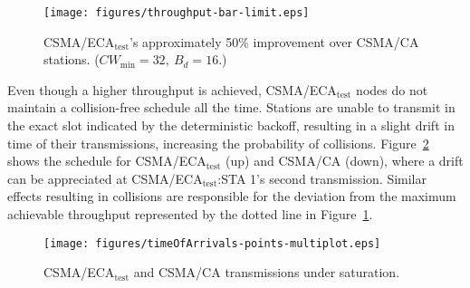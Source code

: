 \documentclass[conference]{IEEEtran}
\begin{document}
	
	\begin{figure}[htbp]
		\centering
		\texttt{[image: figures/throughput-bar-limit.eps]}
		\caption{CSMA/ECA$_{\text{test}}$'s approximately 50\% improvement over CSMA/CA stations. ($CW_{\min}=32,~B_{d}=16$.)}
		\label{fig:throughput}
	\end{figure}

Even though a higher throughput is achieved, CSMA/ECA$_{\text{test}}$ nodes do not maintain a collision-free schedule all the time. Stations are unable to transmit in the exact slot indicated by the deterministic backoff, resulting in a slight drift in time of their transmissions, increasing the probability of collisions. Figure~\ref{fig:ECA-test} shows the schedule for CSMA/ECA$_{\text{test}}$ (up) and CSMA/CA (down), where a drift can be appreciated at CSMA/ECA$_{\text{test}}$:STA 1's second transmission. Similar effects resulting in collisions are responsible for the deviation from the maximum achievable throughput represented by the dotted line in Figure~\ref{fig:throughput}.



	\begin{figure}[htbp]
		\centering
		\texttt{[image: figures/timeOfArrivals-points-multiplot.eps]}
		\caption{CSMA/ECA$_{\text{test}}$ and CSMA/CA transmissions under saturation.}
		\label{fig:ECA-test}
	\end{figure}
\end{document}
